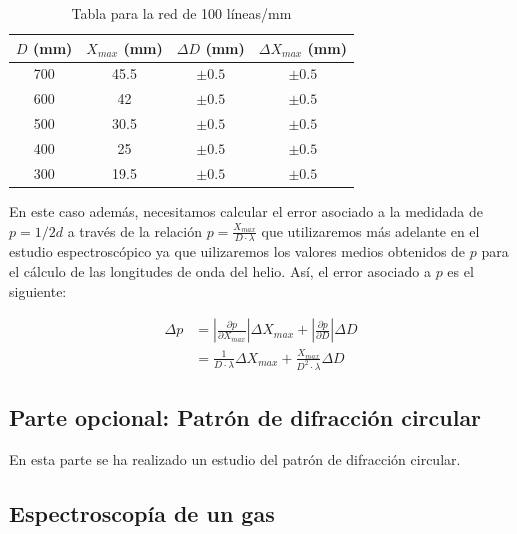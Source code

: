 \documentclass[11pt, a4paper, twocolumn]{article}
\begin{document}
\begin{table}[H]
    \caption{Tabla para la red de 100 líneas/mm}
    \centering
    \small
    \setlength{\tabcolsep}{4pt}

    \begin{tabular}{cccc}
        \hline
        $D$ (mm) &   $X_{max}$ (mm) & $\Delta D$ (mm)   & $\Delta X_{max}$ (mm)   \\
        \hline
            700 &             45.5 & $\pm 0.5$         & $\pm 0.5$               \\
            600 &             42   & $\pm 0.5$         & $\pm 0.5$               \\
            500 &             30.5 & $\pm 0.5$         & $\pm 0.5$               \\
            400 &             25   & $\pm 0.5$         & $\pm 0.5$               \\
            300 &             19.5 & $\pm 0.5$         & $\pm 0.5$               \\
        \hline
    \end{tabular}

\end{table}

En este caso además, necesitamos calcular el error asociado a la medidada de $p = 1/2d$ a través de la relación $p = \frac{X_{max}}{D \cdot \lambda}$ que utilizaremos
más adelante en el estudio espectroscópico ya que uilizaremos los valores medios obtenidos de $p$ para el cálculo de las longitudes de onda del helio. Así, el error asociado a $p$ es el siguiente:

\begin{align}
    \Delta p &= \left|\frac{\partial p}{\partial X_{max}}\right|\Delta X_{max} + \left|\frac{\partial p}{\partial D}\right|\Delta D \\
    &= \frac{1}{D \cdot \lambda} \Delta X_{max} + \frac{X_{max}}{D^2 \cdot \lambda} \Delta D
\end{align}

\subsection{Parte opcional: Patrón de difracción circular}
En esta parte se ha realizado un estudio del patrón de difracción circular.

\subsection{Espectroscopía de un gas}
\end{document}
